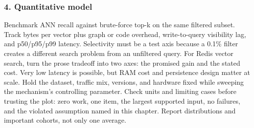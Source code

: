 \subsubsection*{4. Quantitative model}
Benchmark ANN recall against brute-force top-k on the same filtered subset. Track bytes per vector plus graph or code overhead, write-to-query visibility lag, and p50/p95/p99 latency. Selectivity must be a test axis because a 0.1\% filter creates a different search problem from an unfiltered query.
For Redis vector search, turn the prose tradeoff into two axes: the promised gain and the stated cost. Very low latency is possible, but RAM cost and persistence design matter at scale. Hold the dataset, traffic mix, versions, and hardware fixed while sweeping the mechanism's controlling parameter.
Check units and limiting cases before trusting the plot: zero work, one item, the largest supported input, no failures, and the violated assumption named in this chapter. Report distributions and important cohorts, not only one average.
